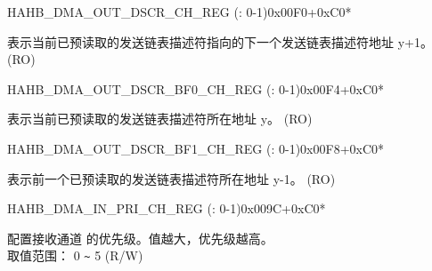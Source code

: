 \begin{register}{H}{AHB\_DMA\_OUT\_DSCR\_CH\_REG (: 0-1)}{0x00F0+0xC0*}\label{regdesc:AHBDMAOUTDSCRCHNREG}
%
\regnewline%
\begin{regdesc}\begin{reglist}
\label{fielddesc:AHBDMAOUTLINKDSCRCHN}\item [AHB\_DMA\_OUTLINK\_DSCR\_CH\regindex{n}] 表示当前已预读取的发送链表描述符指向的下一个发送链表描述符地址 y+1。 (RO)
\end{reglist}\end{regdesc}
\end{register}


\begin{register}{H}{AHB\_DMA\_OUT\_DSCR\_BF0\_CH\_REG (: 0-1)}{0x00F4+0xC0*}\label{regdesc:AHBDMAOUTDSCRBF0CHNREG}
%
\regnewline%
\begin{regdesc}\begin{reglist}
\label{fielddesc:AHBDMAOUTLINKDSCRBF0CHN}\item [AHB\_DMA\_OUTLINK\_DSCR\_BF0\_CH\regindex{n}] 表示当前已预读取的发送链表描述符所在地址 y。 (RO)
\end{reglist}\end{regdesc}
\end{register}


\begin{register}{H}{AHB\_DMA\_OUT\_DSCR\_BF1\_CH\_REG (: 0-1)}{0x00F8+0xC0*}\label{regdesc:AHBDMAOUTDSCRBF1CHNREG}
%
\regnewline%
\begin{regdesc}\begin{reglist}
\label{fielddesc:AHBDMAOUTLINKDSCRBF1CHN}\item [AHB\_DMA\_OUTLINK\_DSCR\_BF1\_CH\regindex{n}] 表示前一个已预读取的发送链表描述符所在地址 y-1。 (RO)
\end{reglist}\end{regdesc}
\end{register}


\begin{register}{H}{AHB\_DMA\_IN\_PRI\_CH\_REG (: 0-1)}{0x009C+0xC0*}\label{regdesc:AHBDMAINPRICHNREG}
%
%
\regnewline%
\begin{regdesc}\begin{reglist}
\label{fielddesc:AHBDMARXPRICHN}\item [AHB\_DMA\_RX\_PRI\_CH\regindex{n}] 配置接收通道  的优先级。值越大，优先级越高。 \\
取值范围： 0 \verb+~+ 5 (R/W)
\end{reglist}\end{regdesc}
\end{register}


